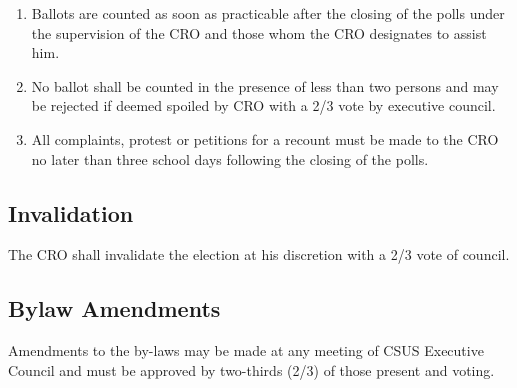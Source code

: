 \begin{enumerate}
\def\labelenumi{\arabic{enumi}.}
\item
  Ballots are counted as soon as practicable after the closing of the
  polls under the supervision of the CRO and those whom the CRO
  designates to assist him.
\item
  No ballot shall be counted in the presence of less than two persons
  and may be rejected if deemed spoiled by CRO with a 2/3 vote by
  executive council.
\item
  All complaints, protest or petitions for a recount must be made to the
  CRO no later than three school days following the closing of the
  polls.
\end{enumerate}

\subsection{Invalidation}\label{invalidation}

The CRO shall invalidate the election at his discretion with a 2/3 vote
of council.

\subsection{Bylaw Amendments}\label{bylaw-amendments}

Amendments to the by-laws may be made at any meeting of CSUS Executive
Council and must be approved by two-thirds (2/3) of those present and
voting.
